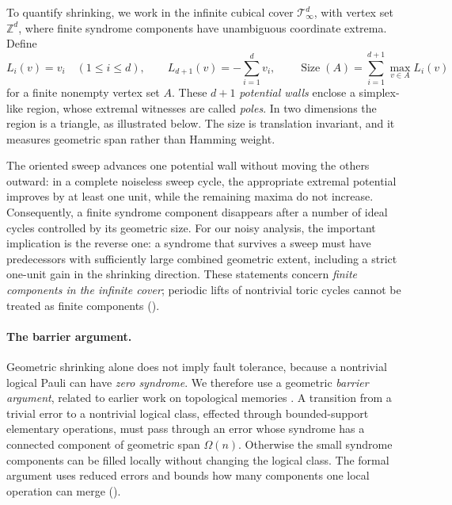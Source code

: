 To quantify shrinking, we work in the infinite cubical cover $\mathcal T_\infty^d$, with vertex set $\mathbb Z^d$, where finite syndrome components have unambiguous coordinate extrema. Define
\begin{equation*}
  L_i(v)=v_i\quad (1\leq i\leq d),
  \qquad L_{d+1}(v)=-\sum_{i=1}^{d}v_i,
  \qquad
  \operatorname{Size}(A)=\sum_{i=1}^{d+1}\max_{v\in A}L_i(v)
\end{equation*}
for a finite nonempty vertex set $A$. These $d+1$ \emph{potential walls} enclose a simplex-like region, whose extremal witnesses are called \emph{poles}. In two dimensions the region is a triangle, as illustrated below. The size is translation invariant, and it measures geometric span rather than Hamming weight.



The oriented sweep advances one potential wall without moving the others outward: in a complete noiseless sweep cycle, the appropriate extremal potential improves by at least one unit, while the remaining maxima do not increase. Consequently, a finite syndrome component disappears after a number of ideal cycles controlled by its geometric size. For our noisy analysis, the important implication is the reverse one: a syndrome that survives a sweep must have predecessors with sufficiently large combined geometric extent, including a strict one-unit gain in the shrinking direction. These statements concern \emph{finite components in the infinite cover}; periodic lifts of nontrivial toric cycles cannot be treated as finite components ().

\paragraph{The barrier argument.}
Geometric shrinking alone does not imply fault tolerance, because a nontrivial logical Pauli can have \emph{zero syndrome}. We therefore use a geometric \emph{barrier argument}, related to earlier work on topological memories \cite{Dennis_2002,BravyiTerhal2009,BombinEtAl2013}. A transition from a trivial error to a nontrivial logical class, effected through bounded-support elementary operations, must pass through an error whose syndrome has a connected component of geometric span $\Omega(n)$. Otherwise the small syndrome components can be filled locally without changing the logical class. The formal argument uses reduced errors and bounds how many components one local operation can merge ().

